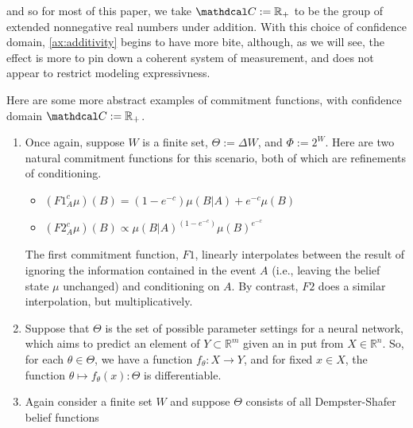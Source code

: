 \documentclass{article}
\def\cofunc{commitment function}
\def\confdom{\mathdcal C}
\def\Rplus{\mathbb R_+}
\begin{document}
\begin{phaseout}
and so for most of this paper, we take $\confdom := \Rplus$ to be the group of extended nonnegative real numbers under addition.
With this choice of confidence domain, \cref{ax:additivity} begins to have more bite, although, as we will see, the effect is more to pin down a coherent system of measurement, and does not appear to restrict modeling expressivness.
%
%


Here are some more abstract examples of \cofunc s, with confidence domain
$\confdom := \mathbb R_+$.
\begin{enumerate}
\item
Once again, suppose $W$ is a finite set,
$\Theta := \Delta W$, and $\Phi := 2^W$.
Here are two natural \cofunc s for this scenario, both of which are refinements of conditioning.
\begin{itemize}
	\item
	$\displaystyle
		(F1^c_A \mu)(B) = (1-e^{-c}) \mu(B|A) +  e^{-c} \mu(B)
	$
	\item
	$\displaystyle
		(F2^c_A \mu)(B) \propto \mu(B|A)^{(1-e^{-c})} \mu(B)^{e^{-c}}
	$
\end{itemize}
The first \cofunc, $F1$, linearly interpolates between the result of ignoring the information contained in the event $A$ (i.e., leaving the belief state $\mu$ unchanged) and conditioning on $A$.
By contrast, $F2$ does a similar interpolation, but multiplicatively.

\item
Suppose that $\Theta$ is the set of possible parameter settings for a neural network, which aims to predict an element of $Y \subset \mathbb R^{m}$ given an in put from $X \in \mathbb R^{n}$.
So, for each $\theta \in \Theta$, we have a function $f_\theta : X \to Y$, and for fixed $x \in X$, the function $\theta \mapsto f_\theta(x) : \Theta$ is differentiable.




\item
Again consider a finite set $W$ and suppose $\Theta$ consists of all Dempster-Shafer belief functions
\end{enumerate}




\end{phaseout}
\end{document}
